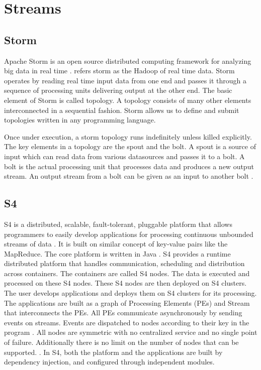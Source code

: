 \section{Streams}
\label{S:o-streams}

\subsection{Storm}

     Apache Storm is an open source distributed computing framework for
     analyzing big data in real time \cite{storm-paper-IJCTT}. refers
     storm as the Hadoop of real time data. Storm operates by reading real
     time input data from one end and passes it through a sequence of
     processing units delivering output at the other end. The basic element
     of Storm is called topology. A topology consists of many other
     elements interconnected in a sequential fashion. Storm allows us to
     define and submit topologies written in any programming language.

     Once under execution, a storm topology runs indefinitely unless killed
     explicitly. The key elements in a topology are the spout and the
     bolt. A spout is a source of input which can read data from various
     datasources and passes it to a bolt. A bolt is the actual processing
     unit that processes data and produces a new output stream. An output
     stream from a bolt can be given as an input to another
     bolt \cite{www-storm-home-concepts}.
     
\subsection{S4}


     S4 is a distributed, scalable, fault-tolerant,
     pluggable platform that allows programmers to easily develop
     applications for processing continuous unbounded streams of
     data \cite{www-s4}. It is built on similar concept of key-value pairs like the
     MapReduce. The core platform is written in
     Java \cite{www-s4-overview}. S4 provides a runtime distributed
     platform that handles communication, scheduling and distribution
     across containers. The containers are called S4 nodes. The data
     is executed and processed on these S4 nodes. These S4 nodes are
     then deployed on S4 clusters. The user develops applications and
     deploys them on S4 clusters for its processing. The applications
     are built as a graph of Processing Elements (PEs) and Stream that
     interconnects the PEs. All PEs communicate asynchronously by
     sending events on streams. Events are dispatched to nodes
     according to their key in the program \cite{www-s4}. All nodes
     are symmetric with no centralized service and no single point of
     failure. Additionally there is no limit on the number of nodes
     that can be supported. \cite{www-wiki-s4}. In S4, both the
     platform and the applications are built by dependency injection,
     and configured through independent modules.


